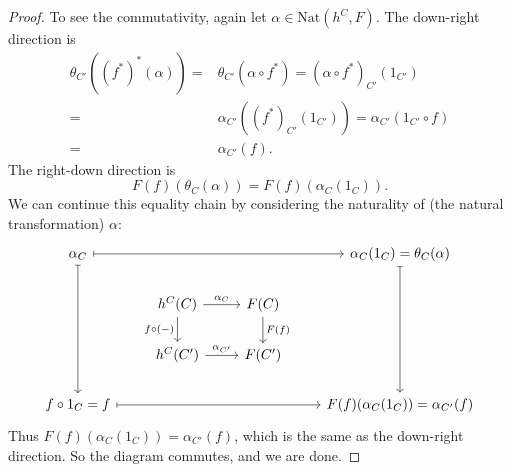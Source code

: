 \documentclass[12pt]{article}
\begin{document}
\begin{proof}
	To see the commutativity, again let $\alpha\in\text{Nat}(h^C, F)$. The down-right direction is 
	\begin{align*}
		\theta_{C'}((f^\ast)^\ast(\alpha)) 
		=& \theta_{C'}(\alpha\circ f^\ast) = (\alpha\circ f^\ast)_{C'}(1_{C'}) \\
		=& \alpha_{C'}((f^\ast)_{C'}(1_{C'})) = \alpha_{C'}(1_{C'}\circ f) \\
		=& \alpha_{C'}(f).
	\end{align*}
	The right-down direction is 
	\begin{equation*}
		F(f)(\theta_C(\alpha))=F(f)(\alpha_C(1_C)).
	\end{equation*}
	We can continue this equality chain by considering the naturality of (the natural transformation) $\alpha$:
	\begin{equation*}
\begin{tikzcd}
\alpha_C \arrow[ddd, maps to] \arrow[rrr, maps to] &                                                       &                        & \alpha_C(1_C)=\theta_C(\alpha) \arrow[ddd, maps to] \\
                                                   & h^C(C) \arrow[d, "f\circ (-)"'] \arrow[r, "\alpha_C"] & F(C) \arrow[d, "F(f)"] &                                                     \\
                                                   & h^C(C') \arrow[r, "\alpha_{C'}"]                      & F(C')                  &                                                     \\
f\circ 1_C=f \arrow[rrr, maps to]                  &                                                       &                        & F(f)(\alpha_C(1_C))=\alpha_{C'}(f)                 
\end{tikzcd}
	\end{equation*}
	Thus $F(f)(\alpha_C(1_C))=\alpha_{C'}(f)$, which is the same as the down-right direction. So the diagram commutes, and we are done.
\end{proof}
\end{document}
